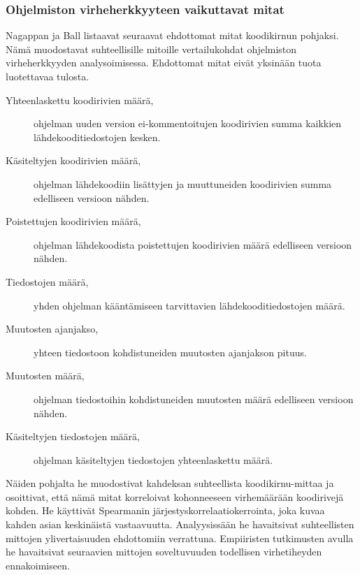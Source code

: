 \documentclass[finnish]{../tktltiki2}
\theoremstyle{definition}
\theoremstyle{remark}
\begin{document}
\subsubsection{Ohjelmiston virheherkkyyteen vaikuttavat mitat}

Nagappan ja Ball listaavat seuraavat ehdottomat mitat koodikirnun pohjaksi. Nämä muodostavat suhteellisille mitoille 
vertailukohdat ohjelmiston virheherkkyyden analysoimisessa. Ehdottomat mitat eivät yksinään tuota luotettavaa tulosta.

\begin{description}
    
    \item[Yhteenlaskettu koodirivien määrä,] ohjelman uuden version ei-kommen\-toitujen koodirivien summa kaikkien 
                                             lähdekooditiedostojen kesken.
    
    \item[Käsiteltyjen koodirivien määrä,] ohjelman lähdekoodiin lisättyjen ja muuttuneiden koodirivien summa 
                                           edelliseen versioon nähden.
    
    \item[Poistettujen koodirivien määrä,] ohjelman lähdekoodista poistettujen koodirivien määrä edelliseen versioon 
                                           nähden.
    
    \item[Tiedostojen määrä,] yhden ohjelman kääntämiseen tarvittavien lähdekoodi\-tiedostojen määrä.
    
    \item[Muutosten ajanjakso,] yhteen tiedostoon kohdistuneiden muutosten ajanjakson pituus.
    
    \item[Muutosten määrä,] ohjelman tiedostoihin kohdistuneiden muutosten määrä edelliseen versioon nähden.
    
    \item[Käsiteltyjen tiedostojen määrä,] ohjelman käsiteltyjen tiedostojen yhteenlaskettu määrä.

\end{description}

    Näiden pohjalta he muodostivat kahdeksan suhteellista koodikirnu-mittaa ja osoittivat, että nämä mitat korreloivat 
kohonneeseen virhemäärään koodirivejä kohden. He käyttivät Spearmanin järjestyskorrelaatiokerrointa, joka kuvaa kahden 
asian keskinäistä vastaavuutta. Analyysissään he havaitsivat suhteellisten mittojen ylivertaisuuden ehdottomiin 
verrattuna. Empiiristen tutkimusten avulla he havaitsivat seuraavien mittojen soveltuvuuden todellisen virhetiheyden 
ennakoimiseen.
\end{document}

